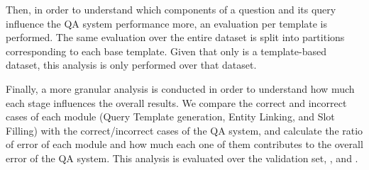 Then, in order to understand which components of a question and its \SPARQL{} query influence the 
QA system performance more, an evaluation per template is performed. The same evaluation over 
the entire dataset is split into partitions corresponding to each \LCQuADtwo{} base template. Given 
that only \LCQuADtwo{} is a template-based dataset, this analysis is only performed over that 
dataset.

Finally, a more granular analysis is conducted in order to understand how much each stage 
influences the overall results. We compare the correct and incorrect cases of each module (Query 
Template generation, Entity Linking, and Slot Filling) with the correct/incorrect cases of the 
QA system, and calculate the ratio of error of each module and how much each one of them 
contributes to the overall error of the QA system. This analysis is evaluated over the \LCQuADtwo{} 
validation set, \QALDseven{}, and \WikiSPARQL{}.
